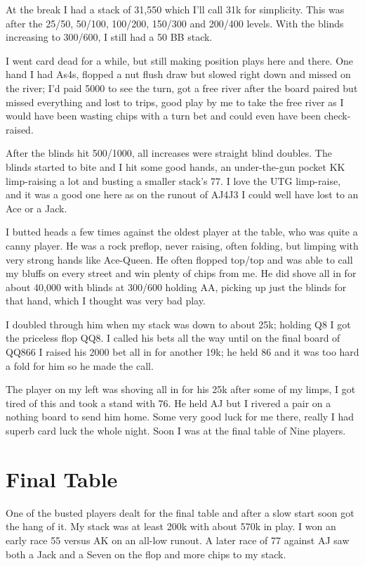 At the break I had a stack of 31,550 which I'll call 31k for simplicity.
This was after the 25/50, 50/100, 100/200, 150/300 and 200/400 levels.
With the blinds increasing to 300/600, I still had a 50 BB stack.

I went card dead for a while, but still making position plays here
and there. One hand I had As4s, flopped a nut flush draw but slowed
right down and missed on the river; I'd paid 5000 to see the turn,
got a free river after the board paired but missed everything and
lost to trips, good play by me to take the free river as I would
have been wasting chips with a turn bet and could even have been
check-raised.

After the blinds hit 500/1000, all increases were straight blind doubles.
The blinds started to bite and I hit some good hands, an under-the-gun
pocket KK limp-raising a lot and busting a smaller stack's 77. I love
the UTG limp-raise, and it was a good one here as on the runout of
AJ4J3 I could well have lost to an Ace or a Jack.

I butted heads a few times against the oldest player at the table,
who was quite a canny player. He was a rock preflop, never raising,
often folding, but limping with very strong hands like Ace-Queen.
He often flopped top/top and was able to call my bluffs on every
street and win plenty of chips from me. He did shove all in for
about 40,000 with blinds at 300/600 holding AA, picking up just
the blinds for that hand, which I thought was very bad play.

I doubled through him when my stack was down to about 25k; holding
Q8 I got the priceless flop QQ8. I called his bets all the way
until on the final board of QQ866 I raised his 2000 bet all in
for another 19k; he held 86 and it was too hard a fold for him
so he made the call.

The player on my left was shoving all in for his 25k after some
of my limps, I got tired of this and took a stand with 76. He
held AJ but I rivered a pair on a nothing board to send him
home. Some very good luck for me there, really I had superb
card luck the whole night. Soon I was at the final table of
Nine players.

\section{Final Table}

One of the busted players dealt for the final table and after
a slow start soon got the hang of it. My stack was at least
200k with about 570k in play. I won an early race 55 versus AK
on an all-low runout. A later race of 77 against AJ saw
both a Jack and a Seven on the flop and more chips to my stack.

